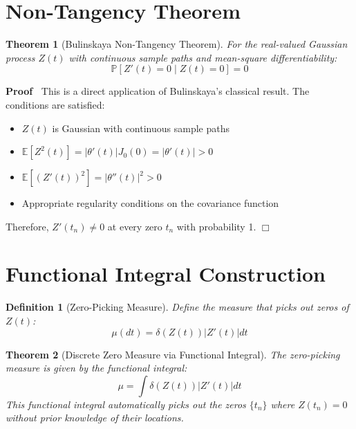 \documentclass{article}
\newenvironment{proof}{\noindent\textbf{Proof\ }}{\hspace*{\fill}$\Box$\medskip}
\newtheorem{definition}{Definition}
\newtheorem{theorem}{Theorem}
\begin{document}
\section{Non-Tangency Theorem}

\begin{theorem}
  [Bulinskaya Non-Tangency Theorem] For the real-valued Gaussian process $Z
  (t)$ with continuous sample paths and mean-square differentiability:
  \begin{equation}
    \mathbb{P} [Z' (t) = 0 \mid Z (t) = 0] = 0
  \end{equation}
\end{theorem}

\begin{proof}
  This is a direct application of Bulinskaya's classical result. The
  conditions are satisfied:
  \begin{itemize}
    \item $Z (t)$ is Gaussian with continuous sample paths
    
    \item $\mathbb{E} [Z^2 (t)] = | \theta' (t) | J_0 (0) = | \theta' (t) | >
    0$
    
    \item $\mathbb{E} [(Z' (t))^2] = | \theta'' (t) |^2 > 0$
    
    \item Appropriate regularity conditions on the covariance function
  \end{itemize}
  Therefore, $Z' (t_n) \neq 0$ at every zero $t_n$ with probability 1.
\end{proof}

\section{Functional Integral Construction}

\begin{definition}
  [Zero-Picking Measure] Define the measure that picks out zeros of $Z (t)$:
  \begin{equation}
    \mu (dt) = \delta (Z (t)) |Z' (t) | dt
  \end{equation}
\end{definition}

\begin{theorem}
  [Discrete Zero Measure via Functional Integral] The zero-picking measure is
  given by the functional integral:
  \begin{equation}
    \mu = \int \delta (Z (t)) |Z' (t) | dt
  \end{equation}
  This functional integral automatically picks out the zeros $\{t_n \}$ where
  $Z (t_n) = 0$ without prior knowledge of their locations.
\end{theorem}
\end{document}
